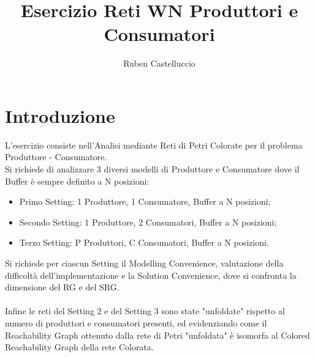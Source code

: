 \documentclass{article}
\title{Esercizio Reti WN Produttori e Consumatori}
\author{Ruben Castelluccio}
\begin{document}
\maketitle

\section{Introduzione}
L'esercizio consiste nell'Analisi mediante Reti di Petri Colorate per il problema Produttore - Consumatore.
\\ Si richiede di analizzare 3 diversi modelli di Produttore e Consumatore dove il Buffer è sempre definito a N posizioni:
\begin{itemize}
    \item Primo Setting: 1 Produttore, 1 Consumatore, Buffer a N posizioni;
    \item Secondo Setting: 1 Produttore, 2 Consumatori, Buffer a N posizioni;
    \item Terzo Setting: P Produttori, C Consumatori, Buffer a N posizioni.
    \end{itemize}
   Si richiede per ciascun Setting il Modelling Convenience, valutazione della difficoltà dell'implementazione e la Solution Convenience, dove si confronta la dimensione del RG e del SRG.
   \\\\Infine le reti del Setting 2 e del Setting 3 sono state "unfoldate" rispetto al numero di produttori e consumatori presenti, ed evidenziando come il Reachability Graph ottenuto dalla rete di Petri "unfoldata" è isomorfa al Colored Reachability Graph della rete Colorata.
\clearpage
\end{document}
